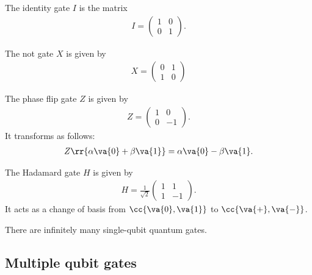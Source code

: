 \documentclass{article}
\begin{document}
\begin{definition}
  \label{def:identity}
  The identity gate $I$ is the matrix
  \begin{align*}
    I = \begin{pmatrix}
      1 & 0 \\ 0 & 1
    \end{pmatrix}.
  \end{align*}
\end{definition}

\begin{definition}
  \label{def:not}
  The not gate $X$ is given by
  \begin{align*}
    X = \begin{pmatrix}
      0 & 1 \\ 1 & 0
    \end{pmatrix}
  \end{align*}
\end{definition}

\begin{definition}
  \label{def:phase-flip}
  The phase flip gate $Z$ is given by
  \begin{align*}
    Z = \begin{pmatrix} 1 & 0 \\ 0 & -1 \end{pmatrix}.
  \end{align*}
  It transforms as follows:
  \begin{align*}
    Z \rr{\alpha\va{0} + \beta\va{1}} = \alpha\va{0} - \beta\va{1}.
  \end{align*}
\end{definition}


\begin{definition}
  \label{def:hadamard}
  The Hadamard gate $H$ is given by
  \begin{align*}
    H = \frac{1}{\sqrt{2}} \begin{pmatrix} 1 & 1 \\ 1 & -1 \end{pmatrix}.
  \end{align*}
  It acts as a change of basis from $ \cc{ \va{ 0 }, \va{ 1 } } $ to $ \cc{ \va{ + }, \va{ - } }$.
\end{definition}

\begin{theorem}
  \label{thm:infinite-gates}
  There are infinitely many single-qubit quantum gates.
\end{theorem}

\subsection{Multiple qubit gates}
\label{sec:multiple-qubit-gates}
\end{document}
